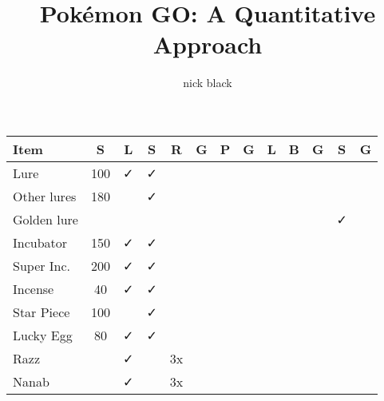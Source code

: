 \documentclass[ebook,10pt,openany,oneside]{memoir}
\title{Pokémon GO: A Quantitative Approach}
\author{nick black}
\newcommand\Midrule[0]{\midrule}%
\begin{document}
\begin{table}
\scriptsize
\centering
\begin{tabular}{p{}cccccccccccc}
Item              & S%
                         & L%
                             & S%
                                   & R%
                                        & G%
                                             & P%
                                                   & G%
                                                         & L%
                                                               & B%
                                                                   & G%
                                                                       & S%
                                                                           & G\\%
\Midrule
Lure              & 100  & ✓ & ✓   &    &    &     &     &     &   &   &   &   \\
Other lures       & 180  &   & ✓   &    &    &     &     &     &   &   &   &   \\
Golden lure       &      &   &     &    &    &     &     &     &   &   & ✓ &   \\
Incubator         & 150  & ✓ & ✓   &    &    &     &     &     &   &   &   &   \\
Super Inc.        & 200  & ✓ & ✓   &    &    &     &     &     &   &   &   &   \\
Incense           & 40   & ✓ & ✓   &    &    &     &     &     &   &   &   &   \\
Star Piece        & 100  &   & ✓   &    &    &     &     &     &   &   &   &   \\
Lucky Egg         & 80   & ✓ & ✓   &    &    &     &     &     &   &   &   &   \\
Razz              &      & ✓ &     & 3x &    &     &     &     &   &   &   &   \\
Nanab             &      & ✓ &     & 3x &    &     &     &     &   &   &   &   \\

\end{tabular}
\end{table}
\end{document}
